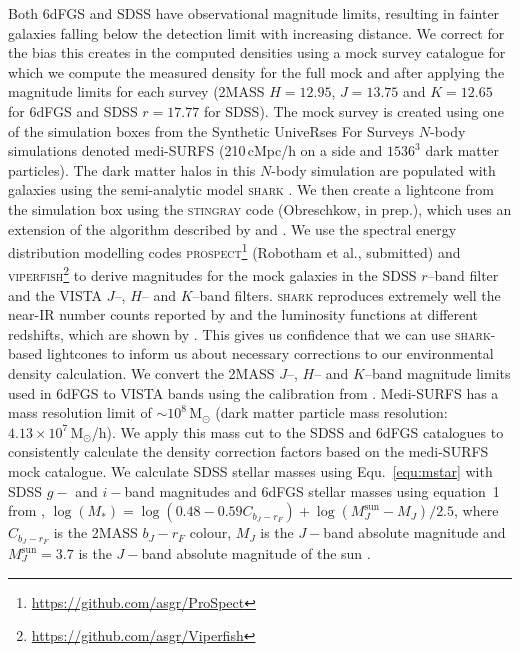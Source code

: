 \documentclass[fleqn,usenatbib]{mnras}
\begin{document}
Both 6dFGS and SDSS have observational magnitude limits, resulting in fainter galaxies falling below the detection limit with increasing distance. We correct for the bias this creates in the computed densities using a mock survey catalogue for which we compute the measured density for the full mock and after applying the magnitude limits for each survey (2MASS $H=12.95$, $J=13.75$ and $K=12.65$ for 6dFGS and SDSS $r=17.77$ for SDSS). The mock survey is created using one of the simulation boxes from the Synthetic UniveRses For Surveys \citep[SURFS,][]{Elahi2018} $N$-body simulations denoted medi-SURFS (210\,cMpc/h on a side and $1536^3$ dark matter particles). The dark matter halos in this $N$-body simulation are populated with galaxies using the semi-analytic model \textsc{shark} \citep{Lagos2018}. We then create a lightcone from the simulation box using the \textsc{stingray} code (Obreschkow, in prep.), which uses an extension of the algorithm described by \cite{Blaizot2005} and \cite{Obreschkow2009}. We use the spectral energy distribution modelling codes \textsc{prospect}\footnote{\url{https://github.com/asgr/ProSpect}} (Robotham et al., submitted) and \textsc{viperfish}\footnote{\url{https://github.com/asgr/Viperfish}} \citep{Lagos2019} to derive magnitudes for the mock galaxies in the SDSS $r$--band filter and the VISTA $J$--, $H$-- and $K$--band filters. \textsc{shark} reproduces extremely well the near-IR number counts reported by \cite{Driver2016} and the luminosity functions at different redshifts, which are shown by \cite{Lagos2019}. This gives us confidence that we can use \textsc{shark}-based lightcones to inform us about necessary corrections to our environmental density calculation. We convert the 2MASS $J$--, $H$-- and $K$--band magnitude limits used in 6dFGS to VISTA bands using the calibration from \cite{GonzalezFernandez2018}. Medi-SURFS has a mass resolution limit of $\sim10^8\,\mathrm{M}_{\odot}$ (dark matter particle mass resolution: $4.13\times10^7\,\mathrm{M}_{\odot}$/h). We apply this mass cut to the SDSS and 6dFGS catalogues to consistently calculate the density correction factors based on the medi-SURFS mock catalogue. We calculate SDSS stellar masses using Equ.~\ref{equ:mstar} with SDSS $g-$ and $i-$band magnitudes and 6dFGS stellar masses using equation~1 from \cite{Beutler2013}, $\log(M_*)=\log(0.48-0.59C_{b_J-r_F}) + \log(M_J^{\mathrm{sun}}-M_J)/2.5$, where $C_{b_J-r_F}$ is the 2MASS $b_J-r_F$ colour, $M_J$ is the $J-$band absolute magnitude and $M_J^{\mathrm{sun}}=3.7$ is the $J-$band absolute magnitude of the sun \citep{Worthey1994}. 
\end{document}
